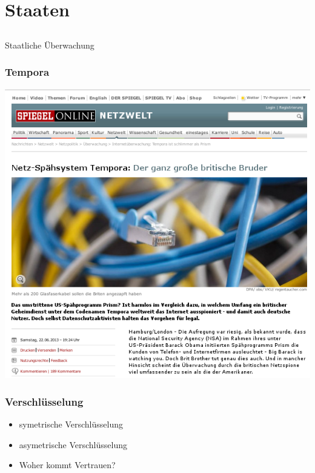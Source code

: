 \documentclass[12pt]{beamer}
\begin{document}
\section{Staaten}
\subsection{}

\begin{frame}
  \begin{center}\Large
    Staatliche Überwachung
  \end{center}
\end{frame}

\begin{frame}
    \frametitle{Tempora}
    \includegraphics[height=0.7\textheight]{img/spiegel-tempora.png}
\end{frame}

\begin{frame}
    \frametitle{Verschlüsselung}
    \begin{itemize}
      \item<2-> symetrische Verschlüsselung
      \item<3-> asymetrische Verschlüsselung
      \item<4-> Woher kommt Vertrauen?
    \end{itemize}
\end{frame}
\end{document}
